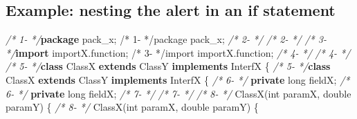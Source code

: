 \documentclass[
]{article}
\newenvironment{Shaded}{\begin{snugshade}}{\end{snugshade}}
\newcommand{\CommentTok}[1]{\textcolor[rgb]{0.56,0.35,0.01}{\textit{#1}}}
\newcommand{\DataTypeTok}[1]{\textcolor[rgb]{0.13,0.29,0.53}{#1}}
\newcommand{\FunctionTok}[1]{\textcolor[rgb]{0.00,0.00,0.00}{#1}}
\newcommand{\ImportTok}[1]{#1}
\newcommand{\KeywordTok}[1]{\textcolor[rgb]{0.13,0.29,0.53}{\textbf{#1}}}
\newcommand{\NormalTok}[1]{#1}
\begin{document}
\begin{landscape}

\subsection{Example: nesting the alert in an if statement} \label{example_nested_in_other_if}

\small

\normalsize

\scriptsize

\begin{Shaded}
\begin{Highlighting}[]
\CommentTok{/*  1-                 */}\KeywordTok{package}\ImportTok{ pack_x;                                                /*  1-                 */package pack_x;}                                                
\CommentTok{/*  2-                 */}                                                               \CommentTok{/*  2-                 */}                                                               
\CommentTok{/*  3-                 */}\KeywordTok{import}\ImportTok{ importX.function;                                       /*  3-                 */import importX.function;}                                       
\CommentTok{/*  4-                 */}                                                               \CommentTok{/*  4-                 */}                                                               
\CommentTok{/*  5-                 */}\KeywordTok{class}\NormalTok{ ClassX }\KeywordTok{extends}\NormalTok{ ClassY }\KeywordTok{implements}\NormalTok{ InterfX \{               }\CommentTok{/*  5-                 */}\KeywordTok{class}\NormalTok{ ClassX }\KeywordTok{extends}\NormalTok{ ClassY }\KeywordTok{implements}\NormalTok{ InterfX \{               }
\CommentTok{/*  6-                 */}    \KeywordTok{private} \DataTypeTok{long}\NormalTok{ fieldX;                                       }\CommentTok{/*  6-                 */}    \KeywordTok{private} \DataTypeTok{long}\NormalTok{ fieldX;                                       }
\CommentTok{/*  7-                 */}                                                               \CommentTok{/*  7-                 */}                                                               
\CommentTok{/*  8-                 */}    \FunctionTok{ClassX}\NormalTok{(}\DataTypeTok{int}\NormalTok{ paramX, }\DataTypeTok{double}\NormalTok{ paramY) \{                                }\CommentTok{/*  8-                 */}    \FunctionTok{ClassX}\NormalTok{(}\DataTypeTok{int}\NormalTok{ paramX, }\DataTypeTok{double}\NormalTok{ paramY) \{                                }

\end{Highlighting}
\end{Shaded}
\end{landscape}
\end{document}
